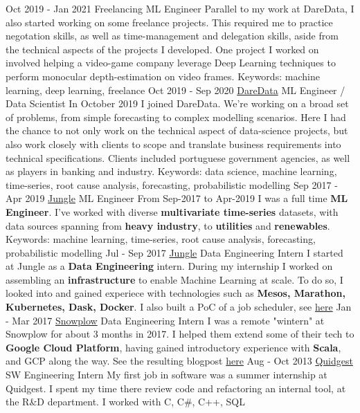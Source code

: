 \documentclass[]{colobas-cv}
\begin{document}
\entry
  {Oct 2019 - Jan 2021}
  {Freelancing}
  {ML Engineer}
  {Parallel to my work at DareData, I also started working on some freelance projects.
   This required me to practice negotation skills, as well as time-management and delegation
   skills, aside from the technical aspects of the projects I developed. One project I worked
   on involved helping a video-game company leverage Deep Learning techniques to perform
   monocular depth-estimation on video frames.
   Keywords: machine learning, deep learning, freelance}
\entry
  {Oct 2019 - Sep 2020}
  {\href{https://daredata.engineering}{DareData}}
  {ML Engineer / Data Scientist}
  {In October 2019 I joined DareData. We're working on a broad set of problems,
  from simple forecasting to complex modelling scenarios. Here I had the chance
  to not only work on the technical aspect of data-science projects, but also
  work closely with clients to scope and translate business requirements into
  technical specifications. Clients included portuguese government agencies,
  as well as players in banking and industry.
  Keywords: data science, machine learning, time-series, root cause analysis, forecasting,
  probabilistic modelling}
\entry
  {Sep 2017 - Apr 2019}
  {\href{https://jungle.ai}{Jungle}}
  {ML Engineer}
  {From Sep-2017 to Apr-2019 I was a full time \textbf{ML Engineer}. I've worked with diverse 
  \textbf{multivariate time-series} datasets, with data sources spanning from 
  \textbf{heavy industry}, to \textbf{utilities} and \textbf{renewables}.
  Keywords: machine learning, time-series, root cause analysis, forecasting,
  probabilistic modelling}
\entry
  {Jul - Sep 2017}
  {\href{https://jungle.ai}{Jungle}}
  {Data Engineering Intern}
  {I started at Jungle as a \textbf{Data Engineering} intern. During my internship I
  worked on assembling an \textbf{infrastructure} to enable Machine Learning at scale.
  To do so, I looked into and gained experiece with technologies such as
  \textbf{Mesos, Marathon, Kubernetes, Dask, Docker}. I also built a PoC of a
  job scheduler, see \href{https://github.com/colobas/obras}{here}}
\entry
  {Jan - Mar 2017}
  {\href{https://snowplowanalytics.com}{Snowplow}}
  {Data Engineering Intern}
  {I was a remote "wintern" at Snowplow for about 3 months in 2017. I helped
  them extend some of their tech to \textbf{Google Cloud Platform}, having gained 
  introductory experience with \textbf{Scala}, and GCP along the way. See the
  resulting blogpost \href{https://snowplowanalytics.com/blog/2017/03/30/google-cloud-dataflow-example-project-released/}{here}}
\entry
  {Aug - Oct 2013}
  {\href{https://quidgest.com}{Quidgest}}
  {SW Engineering Intern}
  {My first job in software was a summer internship at Quidgest. I spent my time
  there review code and refactoring an internal tool, at the R\&D department.
  I worked with C, C\#, C++, SQL}
\clearpage
\end{document}
